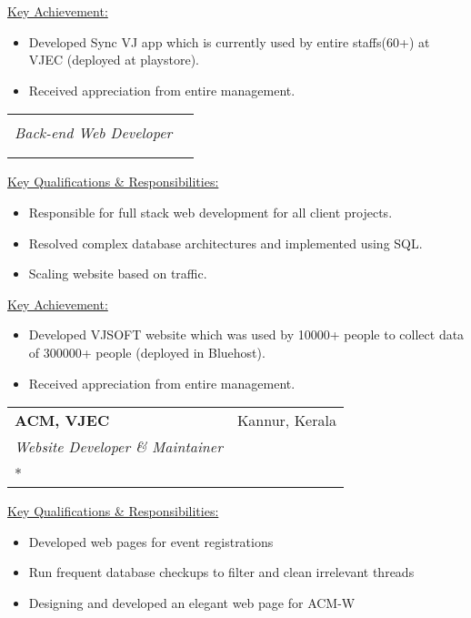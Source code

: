 \documentclass[letterpaper,11pt]{article}
\makeatletter
\newcommand{\resumeSubheading}[4]{
  \vspace{-1pt}\item
    \begin{tabular*}{0.97\textwidth}{l@{\extracolsep{\fill}}r}
      \textbf{#1} & #2 \\
      \textit{\small#3} & \textit{\small #4} \\
    \end{tabular*}\vspace{-5pt}
}
\makeatother
\begin{document}
        \hspace{1cm}\underline{Key Achievement:}
        \begin{itemize}
            \item Developed Sync VJ app which is currently used by entire staffs(60+) at VJEC (deployed at playstore).
            \item Received appreciation from entire management.
            
        \end{itemize}
        
    \resumeSubheading
      { }{ }
      {Back-end Web Developer}{ \\ \\ } 
      
      \hspace{1cm}\underline{Key Qualifications \& Responsibilities:}
          \begin{itemize}
                \item Responsible for full stack web development for all client projects.
                \item Resolved complex database architectures and implemented using SQL.
                \item Scaling website based on traffic.
          \end{itemize}
          
        \hspace{1cm}\underline{Key Achievement:}
        \begin{itemize}
            \item Developed VJSOFT website which was used by 10000+ people to collect data of 300000+ people (deployed in Bluehost).
            \item Received appreciation from entire management.
        \end{itemize}
      
      
    \resumeSubheading
      {ACM, VJEC}{Kannur, Kerala}
      {Website Developer \& Maintainer} {May 2021 - Present \\* } 
      
        \vspace{1mm}\hspace{1cm}\underline{Key Qualifications \& Responsibilities:}
          \begin{itemize}
            \item Developed web pages for event registrations
            \item Run frequent database checkups to filter and clean irrelevant threads
            \item Designing and developed an elegant web page for ACM-W
          \end{itemize}
          
\end{document}

